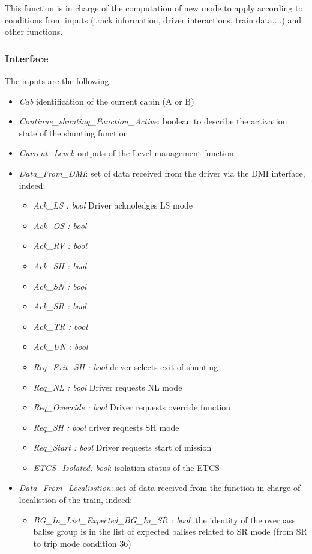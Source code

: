 This function is in charge of the computation of new mode to apply according to conditions from inputs (track information, driver interactions, train data,...) and other functions.

\subsubsection{Interface}

The inputs are the following:
\begin{itemize}
\item \emph{Cab} identification of the current cabin (A or B)
\item \emph{Continue\_shunting\_Function\_Active}: boolean to describe the activation state of the shunting function
\item \emph{Current\_Level}: outputs of the Level management function
\item \emph{Data\_From\_DMI}: set of data received from the driver via the DMI interface, indeed:
\begin{itemize}
\item \emph{Ack\_LS : bool} Driver acknoledges LS mode
\item \emph{Ack\_OS : bool}
\item \emph{Ack\_RV : bool}
\item \emph{Ack\_SH : bool}
\item \emph{Ack\_SN : bool}
\item \emph{Ack\_SR : bool}
\item \emph{Ack\_TR : bool}
\item \emph{Ack\_UN : bool}
\item \emph{Req\_Exit\_SH : bool} driver selects exit of shunting
\item \emph{Req\_NL : bool} Driver requests NL mode
\item \emph{Req\_Override : bool} Driver requests override function
\item \emph{Req\_SH : bool} driver requests SH mode
\item \emph{Req\_Start : bool} Driver requests start of mission
\item \emph{ETCS\_Isolated: bool}: isolation status of the ETCS
\end{itemize}
\item \emph{Data\_From\_Localisstion}: set of data received from the function in charge of localistion of the train, indeed:
\begin{itemize}
\item \emph{BG\_In\_List\_Expected\_BG\_In\_SR : bool}: the identity of the overpass balise group is in the list of expected balises related to SR mode (from SR to trip mode condition 36)

\end{itemize}
\end{itemize}
